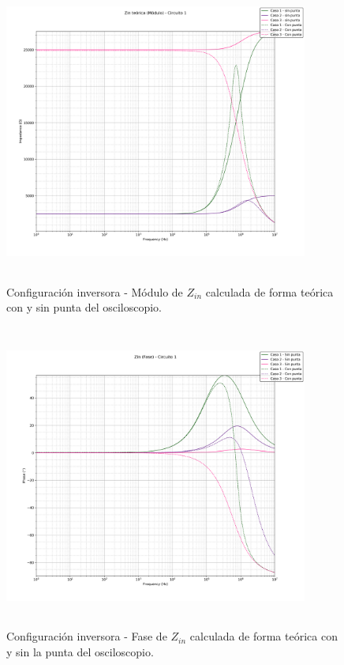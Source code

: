 \begin{figure}[H] %
	\centering
	\includegraphics[width=10cm,height=10cm,keepaspectratio]{../EJ1/00GRAFICOS/teoricos/c1zinm.png}
	\caption{Configuración inversora - M\'odulo de $Z_{in}$ calculada de forma te\'orica con y sin punta del osciloscopio.}
	\label{c1zintm}
\end{figure}

\begin{figure}[H] %
	\centering
	\includegraphics[width=10cm,height=10cm,keepaspectratio]{../EJ1/00GRAFICOS/teoricos/circ1zinfases.png}
	\caption{Configuración inversora - Fase de $Z_{in}$ calculada de forma te\'orica con y sin la punta del osciloscopio.}
	\label{c1zintp}
\end{figure}

